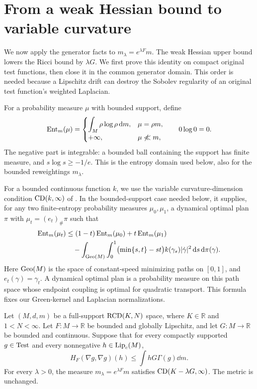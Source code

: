 \section{From a weak Hessian bound to variable curvature}
\label{sec:curvature-change}

We now apply the generator facts to \(m_\lambda=e^{\lambda F}m\).
The weak Hessian upper bound lowers the Ricci bound by
\(\lambda G\). We first prove this identity on compact original
test functions, then close it in the common generator domain. This
order is needed because a Lipschitz drift can destroy the Sobolev
regularity of an original test function's weighted Laplacian.

For a probability measure \(\mu\) with bounded support, define
\[
\operatorname{Ent}_m(\mu)=
\begin{cases}
\displaystyle\int_M\rho\log\rho\,\mathrm d m,&\mu=\rho m,\\
+\infty,&\mu\not\ll m,
\end{cases}
\qquad 0\log0=0.
\]
The negative part is integrable: a bounded ball containing the
support has finite measure, and \(s\log s\ge-1/e\).
This is the entropy domain used below, also for the bounded
reweightings \(m_\lambda\).

For a bounded continuous function \(k\), we use the variable
curvature-dimension condition \(\mathrm{CD}(k,\infty)\) of
\cite[Definition~1.2]{BHS2021}. In the bounded-support case needed
below, it supplies, for any two finite-entropy probability measures
\(\mu_0,\mu_1\), a dynamical optimal plan \(\pi\) with
\(\mu_t=(e_t)_\#\pi\) such that
\begin{align}
\label{weight:variable-entropy}
\operatorname{Ent}_m(\mu_t)
&\le (1-t)\operatorname{Ent}_m(\mu_0)+t\operatorname{Ent}_m(\mu_1)\notag\\
&\quad-\int_{\operatorname{Geo}(M)}\int_0^1
  \bigl(\min\{s,t\}-st\bigr)k(\gamma_s)|\dot\gamma|^2
  \,\mathrm d s\,\mathrm d\pi(\gamma).
\end{align}
Here \(\operatorname{Geo}(M)\) is the space of constant-speed minimizing paths
on \([0,1]\), and \(e_t(\gamma)=\gamma_t\). A dynamical optimal
plan is a probability measure on this path space whose endpoint
coupling is optimal for quadratic transport. This formula fixes
our Green-kernel and Laplacian normalizations.

\begin{proposition}
\label{weight:variable-cd}
Let \((M,d,m)\) be a full-support \(\mathrm{RCD}(K,N)\) space,
where \(K\in\mathbb R\) and \(1<N<\infty\).
Let \(F\colon M\to\mathbb R\) be bounded and globally Lipschitz, and let
\(G\colon M\to\mathbb R\) be bounded and continuous. Suppose
that for every compactly supported \(g\in\operatorname{Test}\) and every
nonnegative \(h\in\operatorname{Lip}_c(M)\),
\[
H_F(\nabla g,\nabla g)(h)
\le\int hG\Gamma(g)\dd m.
\]
For every \(\lambda>0\), the measure
\(m_\lambda=e^{\lambda F}m\) satisfies
\(\mathrm{CD}(K-\lambda G,\infty)\). The metric is unchanged.
\end{proposition}


